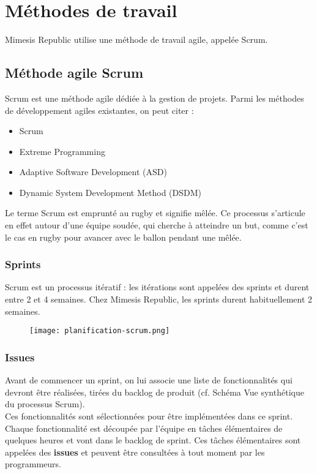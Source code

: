 \chapter{Méthodes de travail}
Mimesis Republic utilise une méthode de travail agile, appelée Scrum.
\section{Méthode agile Scrum}
Scrum est une méthode agile dédiée à la gestion de projets.
Parmi les méthodes de développement agiles existantes, on peut citer :
\begin{itemize}
\item Scrum
\item Extreme Programming
\item Adaptive Software Development (ASD)
\item Dynamic System Development Method (DSDM)\\
\end{itemize}
Le terme Scrum est emprunté au rugby et signifie mêlée. Ce processus
s'articule en effet autour d'une équipe soudée, qui cherche à atteindre un but,
comme c'est le cas en rugby pour avancer avec le ballon pendant une mêlée.\\
\subsection{Sprints}
Scrum est un processus itératif : les itérations sont appelées des sprints et
durent entre 2 et 4 semaines.
Chez Mimesis Republic, les sprints durent habituellement 2 semaines.
\begin{figure}[H]
  \begin{center}
    \texttt{[image: planification-scrum.png]}
  \end{center}
\end{figure}

\clearpage
\subsection{Issues}
Avant de commencer un sprint, on lui associe une liste de fonctionnalités qui
devront être réalisées, tirées du backlog de produit (cf. Schéma Vue synthétique
du processus Scrum).\\
Ces fonctionnalités sont sélectionnées pour être implémentées dans ce sprint.\\

Chaque fonctionnalité est découpée par l'équipe en tâches élémentaires de
quelques heures et vont dans le backlog de sprint. Ces tâches élémentaires sont
appelées des \textbf{issues} et peuvent être consultées à tout moment par les
programmeurs.\\

